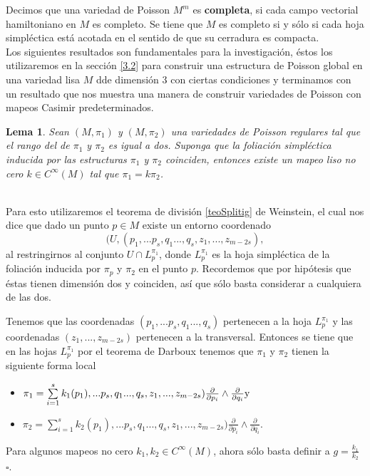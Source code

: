 \documentclass[a4paper,10pt]{book}
\newtheorem{lema}{Lema}[chapter]
\begin{document}
Decimos que una variedad de Poisson $M^{m}$ es {\bfseries completa}, si cada campo vectorial hamiltoniano en $M$ es completo. Se tiene que $M$ es completo si y s\'olo si cada hoja simpl\'ectica est\'a acotada en el sentido de que su cerradura es compacta.\\

Los siguientes resultados son fundamentales para la investigaci\'on, \'estos los utilizaremos en la secci\'on \ref{3.2} para construir una estructura de Poisson global en una variedad lisa $M$ dde dimensi\'on $3$ con ciertas condiciones y terminamos con un resultado que nos muestra una manera de construir variedades de Poisson con mapeos Casimir predeterminados.

\begin{lema}\label{lemma2.9}
Sean $(M,\pi_{1})$ y $(M,\pi_{2})$ una variedades de Poisson regulares tal que el rango del de $\pi_{1}$ y $\pi_{2}$ es igual a dos. Suponga que la foliaci\'on simpl\'ectica inducida por las estructuras $\pi_{1}$ y $\pi_{2}$  coinciden, entonces existe un mapeo liso no cero $k\in C^{\infty}(M)$ tal que $\pi_{1}=k\pi_{2}$.  
\end{lema}
\\
Para esto utilizaremos el teorema de divisi\'on \ref{teoSplitig} de Weinstein, el cual nos dice que dado un punto $p\in M$ existe un entorno coordenado $$(U,(p_{1},...p_{s},q_{1}...,q_{s},z_{1},...,z_{m-2s}),$$ 
al restringirnos al conjunto $U\cap L_{p}^{\pi_{1}}$, donde $L_{p}^{\pi_{1}}$ es la hoja simpl\'ectica de la foliaci\'on inducida por $\pi_{p}$ y $\pi_{2}$ en el punto $p$. Recordemos que por hip\'otesis que \'estas tienen dimensi\'on dos y coinciden, as\'i que s\'olo basta considerar a cualquiera de las dos.
\vspace{5mm}

Tenemos que las coordenadas $(p_{1},...p_{s},q_{1}...,q_{s})$ pertenecen a la hoja $L_{p}^{\pi_{1}}$ y las coordenadas $(z_{1},...,z_{m-2s})$ pertenecen a la transversal. Entonces se tiene que en las hojas $L_{p}^{\pi_{1}}$ por el teorema de Darboux tenemos que $\pi_{1}$ y $\pi_{2}$ tienen la siguiente forma local
\begin{itemize}
    \item $\pi_{1}=\sum\limits^{s}_{i=1}k_{1}(p_{1}),...p_{s},q_{1}...,q_{s},z_{1},...,z_{m-2s})\frac{\partial}{\partial p_{i}}\wedge\frac{\partial}{\partial q_{i}} {\rm y}$ 
    \item $\pi_{2}=\sum\limits^{s}_{i=1}k_{2}(p_{1}),...p_{s},q_{1}...,q_{s},z_{1},...,z_{m-2s})\frac{\partial}{\partial p_{i}}\wedge\frac{\partial}{\partial q_{i}}.$
\end{itemize}
Para algunos mapeos no cero $k_{1},k_{2}\in C^{\infty}(M)$, ahora s\'olo basta definir a $g=\frac{k_{1}}{k_{2}}$  \hfill $\square$.
\end{document}
